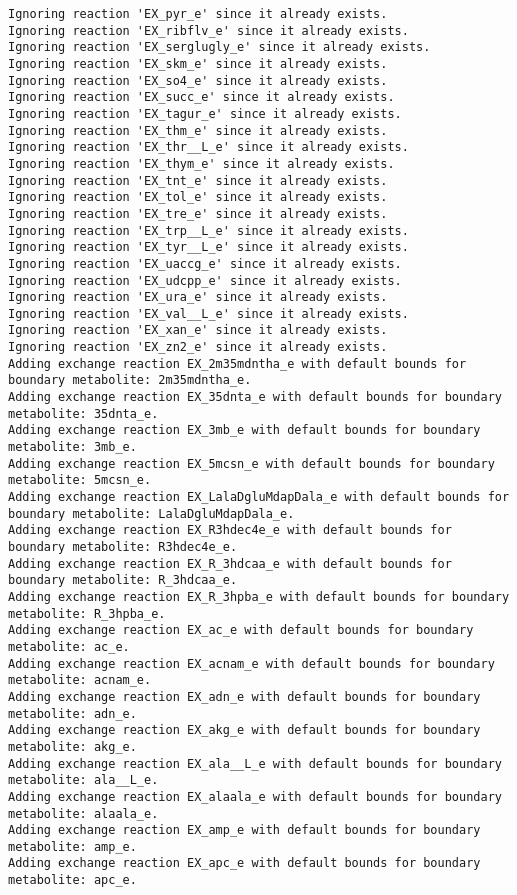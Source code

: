 \documentclass[
  letterpaper,
  DIV=11,
  numbers=noendperiod]{scrartcl}
\begin{document}
\begin{verbatim}
Ignoring reaction 'EX_pyr_e' since it already exists.
Ignoring reaction 'EX_ribflv_e' since it already exists.
Ignoring reaction 'EX_serglugly_e' since it already exists.
Ignoring reaction 'EX_skm_e' since it already exists.
Ignoring reaction 'EX_so4_e' since it already exists.
Ignoring reaction 'EX_succ_e' since it already exists.
Ignoring reaction 'EX_tagur_e' since it already exists.
Ignoring reaction 'EX_thm_e' since it already exists.
Ignoring reaction 'EX_thr__L_e' since it already exists.
Ignoring reaction 'EX_thym_e' since it already exists.
Ignoring reaction 'EX_tnt_e' since it already exists.
Ignoring reaction 'EX_tol_e' since it already exists.
Ignoring reaction 'EX_tre_e' since it already exists.
Ignoring reaction 'EX_trp__L_e' since it already exists.
Ignoring reaction 'EX_tyr__L_e' since it already exists.
Ignoring reaction 'EX_uaccg_e' since it already exists.
Ignoring reaction 'EX_udcpp_e' since it already exists.
Ignoring reaction 'EX_ura_e' since it already exists.
Ignoring reaction 'EX_val__L_e' since it already exists.
Ignoring reaction 'EX_xan_e' since it already exists.
Ignoring reaction 'EX_zn2_e' since it already exists.
Adding exchange reaction EX_2m35mdntha_e with default bounds for boundary metabolite: 2m35mdntha_e.
Adding exchange reaction EX_35dnta_e with default bounds for boundary metabolite: 35dnta_e.
Adding exchange reaction EX_3mb_e with default bounds for boundary metabolite: 3mb_e.
Adding exchange reaction EX_5mcsn_e with default bounds for boundary metabolite: 5mcsn_e.
Adding exchange reaction EX_LalaDgluMdapDala_e with default bounds for boundary metabolite: LalaDgluMdapDala_e.
Adding exchange reaction EX_R3hdec4e_e with default bounds for boundary metabolite: R3hdec4e_e.
Adding exchange reaction EX_R_3hdcaa_e with default bounds for boundary metabolite: R_3hdcaa_e.
Adding exchange reaction EX_R_3hpba_e with default bounds for boundary metabolite: R_3hpba_e.
Adding exchange reaction EX_ac_e with default bounds for boundary metabolite: ac_e.
Adding exchange reaction EX_acnam_e with default bounds for boundary metabolite: acnam_e.
Adding exchange reaction EX_adn_e with default bounds for boundary metabolite: adn_e.
Adding exchange reaction EX_akg_e with default bounds for boundary metabolite: akg_e.
Adding exchange reaction EX_ala__L_e with default bounds for boundary metabolite: ala__L_e.
Adding exchange reaction EX_alaala_e with default bounds for boundary metabolite: alaala_e.
Adding exchange reaction EX_amp_e with default bounds for boundary metabolite: amp_e.
Adding exchange reaction EX_apc_e with default bounds for boundary metabolite: apc_e.

\end{verbatim}
\end{document}
